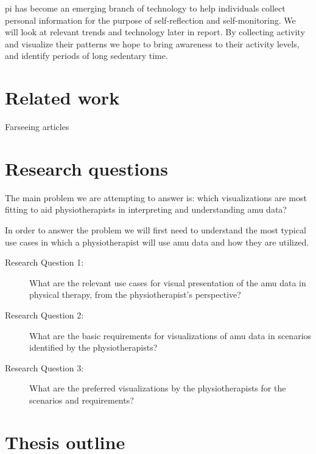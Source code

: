 \gls{pi} has become an emerging branch of technology to help individuals collect personal information for the purpose of self-reflection and self-monitoring. We will look at relevant trends and technology later in report. By collecting activity and visualize their patterns we hope to bring awareness to their activity levels, and identify periods of long sedentary time. 

\section{Related work}
Farseeing articles
\section{Research questions}
The main problem we are attempting to answer is: which visualizations are most fitting to aid physiotherapists in interpreting and understanding \gls{amu} data?


In order to answer the problem we will first need to understand the most typical use cases in which a physiotherapist will use \gls{amu} data and how they are utilized.

\begin{description}
\item[Research Question 1:] What are the relevant use cases for visual presentation of the \gls{amu} data in physical therapy, from the physiotherapist's perspective?

\item[Research Question 2:] What are the basic requirements for visualizations of \gls{amu} data in scenarios identified by the physiotherapists?

\item[Research Question 3:] What are the preferred visualizations by the physiotherapists for the scenarios and requirements?

\end{description}



\section{Thesis outline}